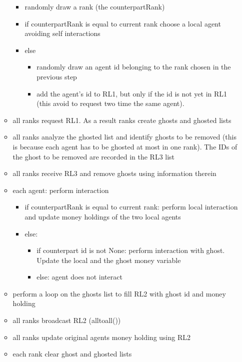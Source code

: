 \documentclass{article}
\providecommand{\tightlist}{%
  \setlength{\itemsep}{0pt}\setlength{\parskip}{0pt}}
\begin{document}
\begin{itemize}
\begin{itemize}
    \begin{itemize}
    \tightlist
    \item
	    randomly draw a rank (the counterpartRank)
    \item
      if counterpartRank is equal to current rank choose a local agent avoiding self interactions
    \item else
       \begin{itemize}
	    \item
	      randomly draw an agent id belonging to the rank chosen in the
	      previous step
	    \item
	      add the agent's id to RL1, but only if the id is not yet in RL1 (this avoid to request two time the same agent). 
       \end{itemize}
    \end{itemize}
  \item
    all ranks request RL1. As a result ranks create ghosts and ghosted lists
  \item 
	  all ranks analyze the ghosted list and identify ghosts to be removed (this is because each agent has to be ghosted at most in one rank). The IDs of the ghost to be removed are recorded in the RL3 list
  \item 
	  all ranks receive RL3 and remove ghosts using information therein
  \item
	  each agent: perform interaction
	  \begin{itemize}
		  \item if counterpartRank is equal to current rank: perform local interaction and update money holdings of the two local agents
		  \item else:
			  \begin{itemize}
				  \item if counterpart id is not None: perform interaction with ghost. Update the local and the
					  ghost money variable
				  \item else: agent does not interact
			  \end{itemize}
	  \end{itemize}
	\item perform a loop on the ghosts list to fill RL2 with ghost id and money holding
	\item all ranks broadcast RL2 (alltoall()) 
	\item all ranks update original agents money holding using RL2
	\item each rank clear ghost and ghosted lists
  \end{itemize}
\end{itemize}
\end{document}
